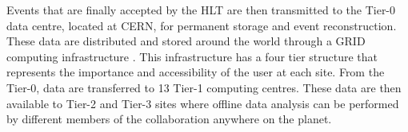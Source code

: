 Events that are finally accepted by the \ac{HLT} are then transmitted
to the Tier-0 data centre, located at CERN, for permanent storage and
event reconstruction. These data are distributed and stored around the
world through a GRID computing infrastructure \cite{Bayatyan:838359}.
This infrastructure has a four tier structure that represents the importance
and accessibility of the user at each site. From the Tier-0, data are
transferred to 13 Tier-1 computing centres. These data are then
available to Tier-2 and Tier-3 sites where offline data analysis can be
performed by different members of the \CMS collaboration anywhere on
the planet.

